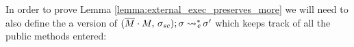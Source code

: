 %
%

In order to prove Lemma \ref{lemma:external_exec_preserves_more} we will need to also define the a version
of $(\overline{M}\cdot M,\, {\sigma_{sc}}); \sigma \rightsquigarrow ^*\!\!\!\!_{e}\, \sigma'$ which keeps track of all the public methods entered:

